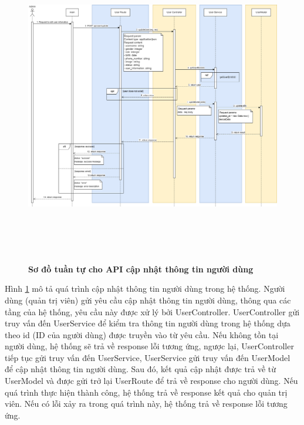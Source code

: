 \begin{figure}[H]
  \centering
  \includegraphics[width=16cm,height=14cm]{Images/sequence_api/editUser.png}
  \caption[Sơ đồ tuần tự cho API cập nhật thông tin người dùng ]{\bfseries \fontsize{12pt}{0pt}
  \selectfont Sơ đồ tuần tự cho API cập nhật thông tin người dùng }
  \label{api_updateUserById} %
\end{figure}
Hình \ref{api_updateUserById} mô tả quá trình cập nhật thông tin người dùng trong hệ thống. Người dùng (quản trị viên) gửi yêu cầu cập nhật thông tin người dùng, thông qua các tầng của hệ thống, 
yêu cầu này được xử lý bởi UserController. UserController gửi truy vấn đến UserService để kiểm tra thông tin người dùng trong hệ thống dựa theo id (ID của người dùng) được truyền vào từ yêu cầu. 
Nếu không tồn tại người dùng, hệ thống sẽ trả về response lỗi tương ứng, ngược lại, UserController tiếp tục gửi truy vấn đến UserService, UserService gửi truy vấn đến UserModel để cập nhật thông tin
người dùng. Sau đó, kết quả cập nhật được trả về từ UserModel và được gửi trở lại UserRoute để trả về response cho người dùng. Nếu quá trình thực hiện thành công, hệ thống trả về response kết quả cho quản trị viên. Nếu có lỗi xảy ra
 trong quá trình này, hệ thống trả về response lỗi tương ứng.

